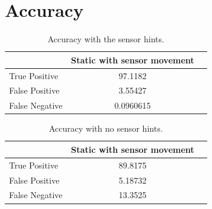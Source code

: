 \section{Accuracy}
\label{s:acc}


\begin{table}[h!]
  \centering
  \caption{Accuracy with the sensor hints.}
  \label{t:dataset}
  \begin{tabular}{  l  c  r  }
   
     & Static with sensor movement  \\
    \hline
    True Positive & 97.1182  \\
    False Positive & 3.55427 \\
    False Negative & 0.0960615 \\
    \hline
  \end{tabular}
\end{table}


\begin{table}[h!]
  \centering
  \caption{Accuracy with no  sensor hints.}
  \label{t:dataset}
  \begin{tabular}{  l  c  r  }
   
     & Static with sensor movement  \\
    \hline
    True Positive & 89.8175  \\
    False Positive & 5.18732 \\
    False Negative & 13.3525 \\
    \hline
  \end{tabular}
\end{table}
 



